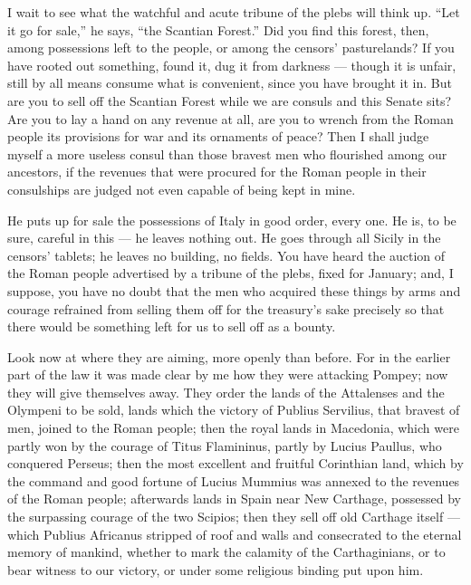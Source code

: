  I wait to see what the watchful and acute tribune of the plebs will think up. ``Let it go for sale,'' he says, ``the Scantian Forest.'' Did you find this forest, then, among possessions left to the people, or among the censors' pasturelands? If you have rooted out something, found it, dug it from darkness --- though it is unfair, still by all means consume what is convenient, since you have brought it in. But are you to sell off the Scantian Forest while we are consuls and this Senate sits? Are you to lay a hand on any revenue at all, are you to wrench from the Roman people its provisions for war and its ornaments of peace? Then I shall judge myself a more useless consul than those bravest men who flourished among our ancestors, if the revenues that were procured for the Roman people in their consulships are judged not even capable of being kept in mine.

 He puts up for sale the possessions of Italy in good order, every one. He is, to be sure, careful in this --- he leaves nothing out. He goes through all Sicily in the censors' tablets; he leaves no building, no fields. You have heard the auction of the Roman people advertised by a tribune of the plebs, fixed for January; and, I suppose, you have no doubt that the men who acquired these things by arms and courage refrained from selling them off for the treasury's sake precisely so that there would be something left for us to sell off as a bounty.

 Look now at where they are aiming, more openly than before. For in the earlier part of the law it was made clear by me how they were attacking Pompey; now they will give themselves away. They order the lands of the Attalenses and the Olympeni to be sold, lands which the victory of Publius Servilius, that bravest of men, joined to the Roman people; then the royal lands in Macedonia, which were partly won by the courage of Titus Flamininus, partly by Lucius Paullus, who conquered Perseus; then the most excellent and fruitful Corinthian land, which by the command and good fortune of Lucius Mummius was annexed to the revenues of the Roman people; afterwards lands in Spain near New Carthage, possessed by the surpassing courage of the two Scipios; then they sell off old Carthage itself --- which Publius Africanus stripped of roof and walls and consecrated to the eternal memory of mankind, whether to mark the calamity of the Carthaginians, or to bear witness to our victory, or under some religious binding put upon him.


